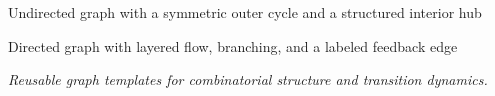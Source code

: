 \begin{center}
    \resizebox{0.58\linewidth}{!}{}

    \small Undirected graph with a symmetric outer cycle and a structured interior hub

    \medskip
    \resizebox{0.70\linewidth}{!}{}

    \small Directed graph with layered flow, branching, and a labeled feedback edge

    \medskip
    \textit{Reusable graph templates for combinatorial structure and transition dynamics.}
\end{center}
